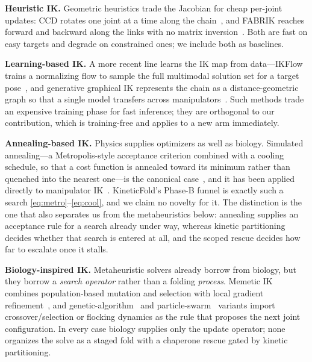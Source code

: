 \documentclass[10pt,conference]{IEEEtran}
\begin{document}
\textbf{Heuristic IK.} Geometric heuristics trade the Jacobian for cheap
per-joint updates: CCD rotates one joint at a time along the chain~\cite{b12},
and FABRIK reaches forward and backward along the links with no matrix
inversion~\cite{b13}. Both are fast on easy targets and degrade on constrained
ones; we include both as baselines.

\textbf{Learning-based IK.} A more recent line learns the IK map from
data---IKFlow trains a normalizing flow to sample the full multimodal solution
set for a target pose~\cite{b14}, and generative graphical IK represents the
chain as a distance-geometric graph so that a single model transfers across
manipulators~\cite{b15}. Such methods trade an expensive training phase for fast
inference; they are orthogonal to our contribution, which is training-free and
applies to a new arm immediately.

\textbf{Annealing-based IK.} Physics supplies optimizers as well as biology.
Simulated annealing---a Metropolis-style acceptance criterion combined with a
cooling schedule, so that a cost function is annealed toward its minimum rather
than quenched into the nearest one---is the canonical case~\cite{b16,b17}, and
it has been applied directly to manipulator IK~\cite{b18}. KineticFold's Phase-B
funnel is exactly such a search \eqref{eq:metro}--\eqref{eq:cool}, and we
claim no novelty for it. The distinction is the one that also separates us from
the metaheuristics below: annealing supplies an acceptance rule for a search
already under way, whereas kinetic partitioning decides whether that search is
entered at all, and the scoped rescue decides how far to escalate once it
stalls.

\textbf{Biology-inspired IK.} Metaheuristic solvers already borrow from biology,
but they borrow a \emph{search operator} rather than a folding \emph{process}.
Memetic IK combines population-based mutation and selection with local gradient
refinement~\cite{b19,b20}, and genetic-algorithm~\cite{b21} and
particle-swarm~\cite{b22} variants import crossover/selection or flocking
dynamics as the rule that proposes the next joint configuration. In every case
biology supplies only the update operator; none organizes the solve as a staged
fold with a chaperone rescue gated by kinetic partitioning.
\end{document}
